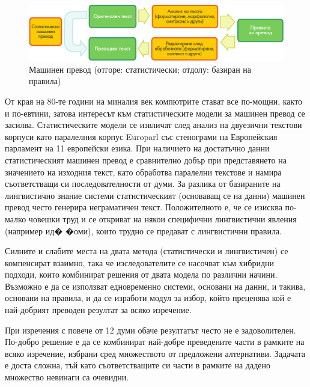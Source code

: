 \documentclass[]{../../metanetpaper}
\begin{document}
\begin{multicols}{2}
\begin{figure}[htb]
  \center
  \includegraphics[width=\textwidth]{../_media/bulgarian/machine_translation}
  \vspace{-2mm}
  \caption{Машинен превод (отгоре: статистически; отдолу: базиран на правила)}
  \label{fig:mtarch_de}
\end{figure}

От края на 80-те години на миналия век компютрите стават все по-мощни, както и по-евтини, затова интересът към статистическите модели за машинен превод се засилва. Статистическите модели се извличат
 след анализ на двуезични текстови корпуси като
 паралелния корпус Europarl със стенограми на
 Европейския парламент на 11 европейски езика. При наличието на достатъчно данни статистическият машинен превод е сравнително добър при представянето на значението на изходния текст, като обработва паралелни текстове и намира съответстващи си последователности от думи. За разлика от базираните на лингвистично знание системи статистическият (основаващ се на данни) машинен превод често генерира неграматичен текст. Положителното е, че се изисква по-малко човешки труд и се откриват на някои специфични лингвистични явления (например ид�
 �оми), които трудно се предават с лингвистични правила. 

Силните и слабите места на двата метода (статистически и лингвистичен) се компенсират взаимно, така че изследователите се насочват към
 хибридни подходи, които комбинират решения от двата модела по различни начини. Възможно е да се използват едновременно системи, основани на данни, и
 такива, основани на правила, и да се изработи модул за избор, който преценява кой е най-добрият преводен резултат за всяко изречение. 

При изречения с повече от 12 думи обаче резултатът често не е задоволителен. По-добро решение е да се комбинират най-добре преведените части в рамките на всяко изречение, избрани сред множеството от предложени алтернативи. 
Задачата е доста сложна, тъй като съответстващите си части в рамките на дадено множество невинаги са очевидни.


\end{multicols}
\end{document}
